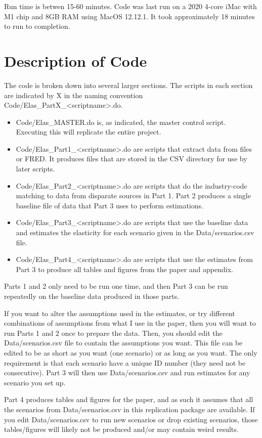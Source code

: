 \documentclass[11pt]{article}
\begin{document}
Run time is betwen 15-60 minutes. Code was last run on a 2020 4-core iMac with M1 chip and 8GB RAM using MacOS 12.12.1. It took approximately 18 minutes to run to completion.

\section{Description of Code}
The code is broken down into several larger sections. The scripts in each section are indicated by X in the naming convention Code/Elas\_PartX\_<scriptname>.do.

\begin{itemize}
	\item Code/Elas\_MASTER.do is, as indicated, the master control script. Executing this will replicate the entire project.
	\item Code/Elas\_Part1\_<scriptname>.do are scripts that extract data from files or FRED. It produces files that are stored in the CSV directory for use by later scripts. 
	\item Code/Elas\_Part2\_<scriptname>.do are scripts that do the industry-code matching to data from disparate sources in Part 1. Part 2 produces a single baseline file of data that Part 3 uses to perform estimations.
	\item Code/Elas\_Part3\_<scriptname>.do are scripts that use the baseline data and estimates the elasticity for each scenario given in the Data/scenarios.csv file. 
	\item Code/Elas\_Part4\_<scriptname>.do are scripts that use the estimates from Part 3 to produce all tables and figures from the paper and appendix. 
\end{itemize}

Parts 1 and 2 only need to be run one time, and then Part 3 can be run repeatedly on the baseline data produced in those parts. 

If you want to alter the assumptions used in the estimates, or try different combinations of assumptions from what I use in the paper, then you will want to run Parts 1 and 2 once to prepare the data. Then, you should edit the Data/scenarios.csv file to contain the assumptions you want. This file can be edited to be as short as you want (one scenario) or as long as you want. The only requirement is that each scenario have a unique ID number (they need not be consecutive). Part 3 will then use Data/scenarios.csv and run estimates for any scenario you set up. 

Part 4 produces tables and figures for the paper, and as such it assumes that all the scenarios from Data/scenarios.csv in this replication package are available. If you edit Data/scenarios.csv to run new scenarios or drop existing scenarios, those tables/figures will likely not be produced and/or may contain weird results. 
\end{document}
